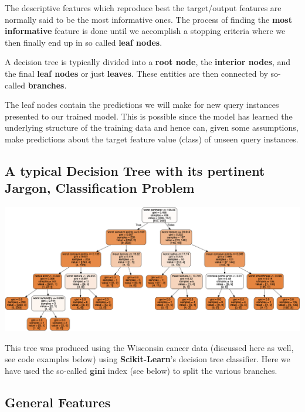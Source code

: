 \documentclass[%
oneside,                 %
final,                   %
10pt]{article}
\begin{document}
The descriptive features which reproduce best the target/output features are normally  said
to be the most informative ones. The process of finding the \textbf{most
informative} feature is done until we accomplish a stopping criteria
where we then finally end up in so called \textbf{leaf nodes}. 

A decision tree is typically divided into a \textbf{root node}, the \textbf{interior nodes},
and the final \textbf{leaf nodes} or just \textbf{leaves}. These entities are then connected by so-called \textbf{branches}.

The leaf nodes
contain the predictions we will make for new query instances presented
to our trained model. This is possible since the model has 
learned the underlying structure of the training data and hence can,
given some assumptions, make predictions about the target feature value
(class) of unseen query instances.

\subsection{A typical Decision Tree with its pertinent Jargon, Classification Problem}



\vspace{6mm}

\centerline{\includegraphics[width=0.8\linewidth]{DataFiles/cancer.png}}

\vspace{6mm}



This tree was produced using the Wisconsin cancer data (discussed here as well, see code examples below) using \textbf{Scikit-Learn}'s decision tree classifier. Here we have used the so-called \textbf{gini} index (see below) to split the various branches.



\subsection{General Features}
\end{document}
